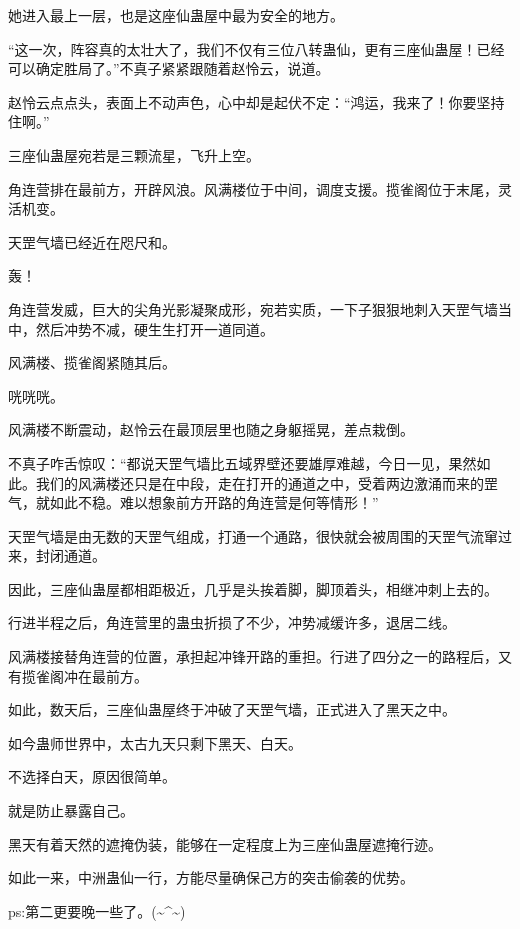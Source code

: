 \begin{this_body}
她进入最上一层，也是这座仙蛊屋中最为安全的地方。

“这一次，阵容真的太壮大了，我们不仅有三位八转蛊仙，更有三座仙蛊屋！已经可以确定胜局了。”不真子紧紧跟随着赵怜云，说道。

赵怜云点点头，表面上不动声色，心中却是起伏不定：“鸿运，我来了！你要坚持住啊。”

三座仙蛊屋宛若是三颗流星，飞升上空。

角连营排在最前方，开辟风浪。风满楼位于中间，调度支援。揽雀阁位于末尾，灵活机变。

天罡气墙已经近在咫尺和。

轰！

角连营发威，巨大的尖角光影凝聚成形，宛若实质，一下子狠狠地刺入天罡气墙当中，然后冲势不减，硬生生打开一道同道。

风满楼、揽雀阁紧随其后。

咣咣咣。

风满楼不断震动，赵怜云在最顶层里也随之身躯摇晃，差点栽倒。

不真子咋舌惊叹：“都说天罡气墙比五域界壁还要雄厚难越，今日一见，果然如此。我们的风满楼还只是在中段，走在打开的通道之中，受着两边激涌而来的罡气，就如此不稳。难以想象前方开路的角连营是何等情形！”

天罡气墙是由无数的天罡气组成，打通一个通路，很快就会被周围的天罡气流窜过来，封闭通道。

因此，三座仙蛊屋都相距极近，几乎是头挨着脚，脚顶着头，相继冲刺上去的。

行进半程之后，角连营里的蛊虫折损了不少，冲势减缓许多，退居二线。

风满楼接替角连营的位置，承担起冲锋开路的重担。行进了四分之一的路程后，又有揽雀阁冲在最前方。

如此，数天后，三座仙蛊屋终于冲破了天罡气墙，正式进入了黑天之中。

如今蛊师世界中，太古九天只剩下黑天、白天。

不选择白天，原因很简单。

就是防止暴露自己。

黑天有着天然的遮掩伪装，能够在一定程度上为三座仙蛊屋遮掩行迹。

如此一来，中洲蛊仙一行，方能尽量确保己方的突击偷袭的优势。

ps:第二更要晚一些了。(\~{}\^{}\~{})

\end{this_body}

